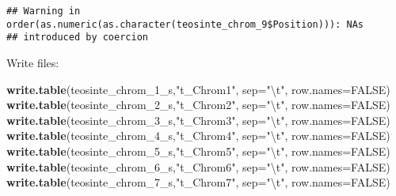 \documentclass[]{article}
\newenvironment{Shaded}{\begin{snugshade}}{\end{snugshade}}
\newcommand{\CharTok}[1]{\textcolor[rgb]{0.31,0.60,0.02}{#1}}
\newcommand{\DataTypeTok}[1]{\textcolor[rgb]{0.13,0.29,0.53}{#1}}
\newcommand{\DecValTok}[1]{\textcolor[rgb]{0.00,0.00,0.81}{#1}}
\newcommand{\KeywordTok}[1]{\textcolor[rgb]{0.13,0.29,0.53}{\textbf{#1}}}
\newcommand{\NormalTok}[1]{#1}
\newcommand{\OperatorTok}[1]{\textcolor[rgb]{0.81,0.36,0.00}{\textbf{#1}}}
\newcommand{\OtherTok}[1]{\textcolor[rgb]{0.56,0.35,0.01}{#1}}
\newcommand{\StringTok}[1]{\textcolor[rgb]{0.31,0.60,0.02}{#1}}
\begin{document}
\begin{verbatim}
## Warning in order(as.numeric(as.character(teosinte_chrom_9$Position))): NAs
## introduced by coercion
\end{verbatim}

\begin{Shaded}
\end{Shaded}

Write files:

\begin{Shaded}
\begin{Highlighting}[]
\KeywordTok{write.table}\NormalTok{(teosinte_chrom_}\DecValTok{1}\NormalTok{_s,}\StringTok{"t_Chrom1"}\NormalTok{, }\DataTypeTok{sep=}\StringTok{"}\CharTok{\textbackslash{}t}\StringTok{"}\NormalTok{, }\DataTypeTok{row.names=}\OtherTok{FALSE}\NormalTok{)}
\KeywordTok{write.table}\NormalTok{(teosinte_chrom_}\DecValTok{2}\NormalTok{_s,}\StringTok{"t_Chrom2"}\NormalTok{, }\DataTypeTok{sep=}\StringTok{"}\CharTok{\textbackslash{}t}\StringTok{"}\NormalTok{, }\DataTypeTok{row.names=}\OtherTok{FALSE}\NormalTok{)}
\KeywordTok{write.table}\NormalTok{(teosinte_chrom_}\DecValTok{3}\NormalTok{_s,}\StringTok{"t_Chrom3"}\NormalTok{, }\DataTypeTok{sep=}\StringTok{"}\CharTok{\textbackslash{}t}\StringTok{"}\NormalTok{, }\DataTypeTok{row.names=}\OtherTok{FALSE}\NormalTok{)}
\KeywordTok{write.table}\NormalTok{(teosinte_chrom_}\DecValTok{4}\NormalTok{_s,}\StringTok{"t_Chrom4"}\NormalTok{, }\DataTypeTok{sep=}\StringTok{"}\CharTok{\textbackslash{}t}\StringTok{"}\NormalTok{, }\DataTypeTok{row.names=}\OtherTok{FALSE}\NormalTok{)}
\KeywordTok{write.table}\NormalTok{(teosinte_chrom_}\DecValTok{5}\NormalTok{_s,}\StringTok{"t_Chrom5"}\NormalTok{, }\DataTypeTok{sep=}\StringTok{"}\CharTok{\textbackslash{}t}\StringTok{"}\NormalTok{, }\DataTypeTok{row.names=}\OtherTok{FALSE}\NormalTok{)}
\KeywordTok{write.table}\NormalTok{(teosinte_chrom_}\DecValTok{6}\NormalTok{_s,}\StringTok{"t_Chrom6"}\NormalTok{, }\DataTypeTok{sep=}\StringTok{"}\CharTok{\textbackslash{}t}\StringTok{"}\NormalTok{, }\DataTypeTok{row.names=}\OtherTok{FALSE}\NormalTok{)}
\KeywordTok{write.table}\NormalTok{(teosinte_chrom_}\DecValTok{7}\NormalTok{_s,}\StringTok{"t_Chrom7"}\NormalTok{, }\DataTypeTok{sep=}\StringTok{"}\CharTok{\textbackslash{}t}\StringTok{"}\NormalTok{, }\DataTypeTok{row.names=}\OtherTok{FALSE}\NormalTok{)}

\end{Highlighting}
\end{Shaded}
\end{document}
